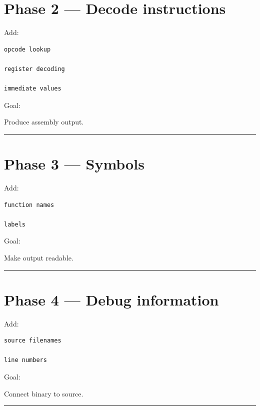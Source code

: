 \documentclass[
  oneside,
  openany]{book}
\begin{document}
\hypertarget{phase-2-decode-instructions}{%
\section{Phase 2 --- Decode
instructions}\label{phase-2-decode-instructions}}

Add:

\begin{verbatim}
opcode lookup

register decoding

immediate values
\end{verbatim}

Goal:

Produce assembly output.

\begin{center}\rule{0.5\linewidth}{0.5pt}\end{center}

\hypertarget{phase-3-symbols}{%
\section{Phase 3 --- Symbols}\label{phase-3-symbols}}

Add:

\begin{verbatim}
function names

labels
\end{verbatim}

Goal:

Make output readable.

\begin{center}\rule{0.5\linewidth}{0.5pt}\end{center}

\hypertarget{phase-4-debug-information}{%
\section{Phase 4 --- Debug
information}\label{phase-4-debug-information}}

Add:

\begin{verbatim}
source filenames

line numbers
\end{verbatim}

Goal:

Connect binary to source.

\begin{center}\rule{0.5\linewidth}{0.5pt}\end{center}
\end{document}
